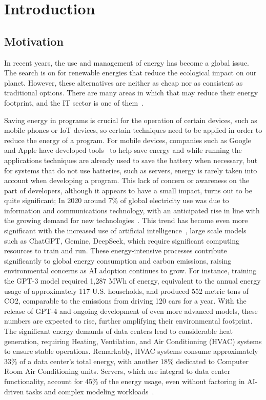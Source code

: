 


\chapter{Introduction}

\section{Motivation}

In recent years, the use and management of energy has become a global issue. The search is on for renewable energies that reduce the ecological impact on our planet. However, these alternatives are neither as cheap nor as consistent as traditional options. There are many areas in which that may reduce their energy footprint, and the IT sector is one of them~\cite{annurev:/content/journals/10.1146/annurev.resource.102308.124234,10.1145/1666420.1666438}.

Saving energy in programs is crucial for the operation of certain devices, such as mobile phones or IoT devices, so certain techniques need to be applied in order to reduce the energy of a program. For mobile devices, companies such as Google and Apple have developed tools~\cite{google_adaptive_battery,google_battery_saver,apple_clean_energy, android_power_profiler} to help save energy and while running the applications techniques are already used to save the battery when necessary, but for systems that do not use batteries, such as servers, energy is rarely taken into account when developing a program. This lack of concern or awareness on the part of developers, although it appears to have a small impact, turns out to be quite significant; In 2020 around 7\% of global electricity use was due to information and communications technology, with an anticipated rise in line with the growing demand for new technologies~\cite{article}. This trend has become even more significant with the increased use of artificial intelligence~\cite{patterson2021carbon}, large scale models such as ChatGPT, Gemine, DeepSeek, which require significant computing resources to train and run. These energy-intensive processes contribute significantly to global energy consumption and carbon emissions, raising environmental concerns as AI adoption continues to grow. For instance, training the GPT-3 model required 1,287 MWh of energy, equivalent to the annual energy usage of approximately 117 U.S. households, and produced 552 metric tons of CO2, comparable to the emissions from driving 120 cars for a year. With the release of GPT-4 and ongoing development of even more advanced models, these numbers are expected to rise, further amplifying their environmental footprint. The significant energy demands of data centers lead to considerable heat generation, requiring Heating, Ventilation, and Air Conditioning (HVAC) systems to ensure stable operations. Remarkably, HVAC systems consume approximately 33\% of a data center's total energy, with another 18\% dedicated to Computer Room Air Conditioning units. Servers, which are integral to data center functionality, account for 45\% of the energy usage, even without factoring in AI-driven tasks and complex modeling workloads~\cite{balaras2017high}.

